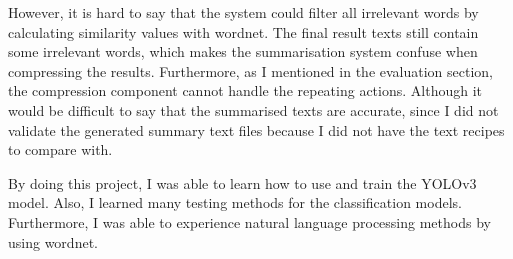 \documentclass{article}
\begin{document}
However, it is hard to say that the system could filter all irrelevant words by calculating similarity values with wordnet. The final result texts still contain some irrelevant words, which makes the summarisation system confuse when compressing the results. Furthermore, as I mentioned in the evaluation section, the compression component cannot handle the repeating actions. Although it would be difficult to say that the summarised texts are accurate, since I did not validate the generated summary text files because I did not have the text recipes to compare with.

By doing this project, I was able to learn how to use and train the YOLOv3 model. Also, I learned many testing methods for the classification models. Furthermore, I was able to experience natural language processing methods by using wordnet.

\newpage
\end{document}
